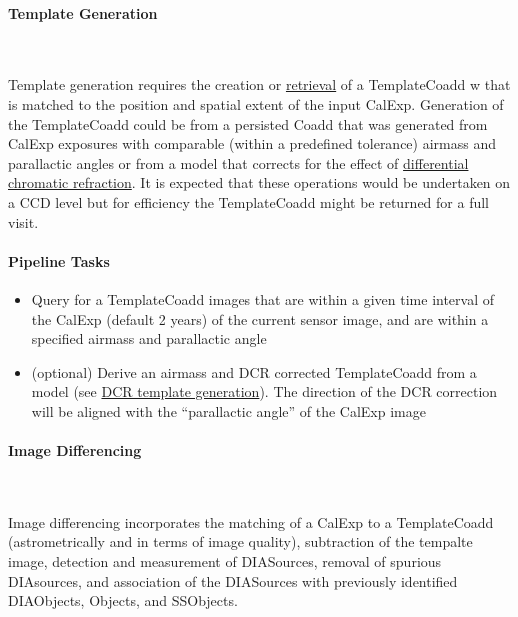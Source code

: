 \paragraph{Template Generation}~

Template generation requires the creation or \hyperref[sec:acRetrieveTemplate]{retrieval} of a TemplateCoadd w that is matched to the position and spatial extent of the input CalExp. Generation of the TemplateCoadd could be from a persisted Coadd that was generated from CalExp exposures with comparable (within a predefined tolerance) airmass and parallactic angles or from a model that corrects for the effect of  \hyperref[sec:acDCRTemplates]{differential chromatic refraction}. It is expected that these operations would be undertaken on a CCD level but for efficiency the TemplateCoadd might be returned for a full visit. 


\paragraph{Pipeline Tasks}
\begin{itemize}
\item Query for a TemplateCoadd images that are within a given time interval of the CalExp  (default 2 years) of the current sensor image, and are within a specified airmass and parallactic angle
\item (optional) Derive an airmass and DCR corrected TemplateCoadd from a model (see  \hyperref[sec:acDCRTemplates]{ DCR template generation}). The direction of the DCR correction will be aligned with the 
  ``parallactic angle'' of the CalExp image
\end{itemize}

\paragraph{Image Differencing}~

Image differencing incorporates the matching of a CalExp to a TemplateCoadd (astrometrically and in terms of image quality), subtraction of the tempalte image, detection and measurement of DIASources, removal of spurious DIAsources, and association of the DIASources with previously identified DIAObjects, Objects, and SSObjects. 

